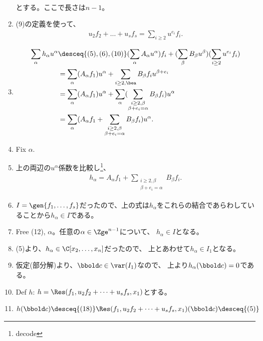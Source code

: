 \begin{myproof}
\begin{enumerate}[label=(\arabic*)]
\begin{align}
    \end{align}
    とする。ここで長さは$n-1$。
    \item
    (9)の定義を使って、
    \begin{align}
      u_2 f_2 + \dots + u_s f_s = \sum_{i\ge 2}u^{e_i}f_i.
    \end{align}
    \item
    \begin{align}
      \sum_\alpha h_\alpha u^\alpha
      &\desceq{(5),(6),(10)}
      (\sum_\alpha A_\alpha u^\alpha)f_i
      +
      (\sum_\beta B_\beta u^\beta)(\sum_{i\ge 2}u^{e_i}f_i)\\
      &=
      \sum_\alpha (A_\alpha f_1)u^\alpha
      +
      \sum_{i\ge 2,\bea}B_\beta f_i u^{\beta + e_i}\\
      &=
      \sum_\alpha(A_\alpha f_1)u^\alpha
      +
      \sum_\alpha (\sum_{\substack{i\ge 2,\beta \\ \beta+e_i = \alpha}}B_\beta f_i)u^\alpha\\
      &=
      \sum_\alpha(A_\alpha f_1 + \sum_{\substack{i\ge 2,\beta \\ \beta+e_i = \alpha}}B_\beta f_i)u^\alpha.
    \end{align}
    \item Fix $\alpha$.
    \item
    上の両辺の$u^\alpha$係数を比較し\footnote{decode}、
    \begin{align}
      h_\alpha = A_\alpha f_1 + \sum_{\substack{i\ge 2,\beta \\ \beta+e_i = \alpha}} B_\beta f_i.
    \end{align}
    \item
    $I=\gen{f_1,\dots,f_s}$だったので、上の式は$h_\alpha$をこれらの結合であらわしていることから$h_\alpha \in I$である。
    \item
    Free (12), $\alpha$。任意の$\alpha \in \Zge^{n-1}$について、
    $h_\alpha \in I$となる。
    \item
    (5)より、$h_\alpha \in \C[x_2,\dots,x_n]$だったので、
    上とあわせて$h_\alpha \in I_1$となる。
    \item
    仮定(部分解)より、$\bbold c\in \var(I_1)$なので、
    上より$h_\alpha(\bbold c)  = 0$である。
    \item
    Def $h$: $h=\Res(f_1,u_2f_2+\dots + u_s f_s, x_1)$とする。
    \item
    \begin{align}
      h(\bbold c)
      \desceq{(18)}
      \Res(f_1,u_2f_2+\dots+u_sf_s,x_1)(\bbold c)
      \desceq{(5)}

\end{align}
\end{enumerate}
\end{myproof}
